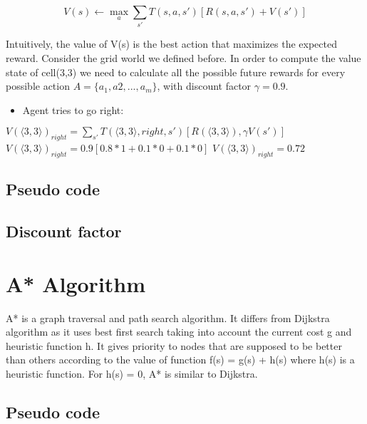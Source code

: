 \documentclass[10pt,a4paper,twocolumn]{article}
\begin{document}
	\begin{equation}
		V(s) \leftarrow \max_{a}{ \sum_{s'}T(s,a,s') [R(s,a,s') + V(s')]}
	\end{equation}
	
	Intuitively, the value of V(s) is the best action that maximizes the expected reward. Consider the grid world we defined before. In order to compute the value state of cell(3,3) we need to calculate all the possible future rewards for every possible action $A = \{ a_{1}, a{2}, ..., a_{m} \}$, with discount factor $\gamma = 0.9$.
	
	
	\begin{itemize}
		\item Agent tries to go right: 
	\end{itemize}

	$V(\big \langle 3,3 \big \rangle)_{right} = \sum_{s'} T(\big \langle 3,3 \big \rangle, right, s') [R(\big \langle 3,3 \big \rangle), \gamma V(s')]$
	\newline
	$V(\big \langle 3,3 \big \rangle)_{right} = 0.9[0.8 * 1 + 0.1 * 0 + 0.1 * 0]$
	\newline
	$V(\big \langle 3,3 \big \rangle)_{right} = 0.72$
		

	
	
	\subsection{Pseudo code}
	\subsection{Discount factor}
	\section{A* Algorithm}
	A* is a graph traversal and path search algorithm. It differs from Dijkstra algorithm as it uses best first search taking into account the current cost g and heuristic function h. It gives priority to nodes that are supposed to be better than others according to the value of function f(s) = g(s) + h(s) where h(s) is a heuristic function. For h(s) = 0, A* is similar to Dijkstra.
	\subsection{Pseudo code}
\end{document}
